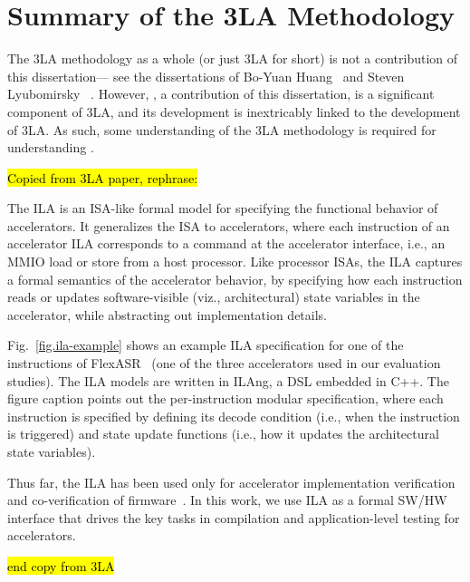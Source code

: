 \section{Summary of the 3LA Methodology}

The 3LA methodology as a whole
  (or just 3LA for short)
  is not a contribution of this dissertation---%
  see the dissertations of
  Bo-Yuan Huang~\cite{huang2022instruction}
  and 
  Steven Lyubomirsky%
  ~\cite{lyubomirsky2022compiler}.
However,
  \g, a contribution of this dissertation,
  is a 
  significant component of 3LA,
  and its development 
  is inextricably linked to the development
  of 3LA.
As such,
  some understanding of the 3LA
  methodology
  is required for understanding
  \g.
  


\hl{
Copied from 3LA paper, rephrase: 
}

The ILA is an ISA-like formal model 
  for specifying the functional behavior of accelerators.
It generalizes the ISA to accelerators, 
  where each 
  instruction of an accelerator ILA corresponds 
  to a command at the accelerator interface, i.e., an MMIO load or store from a host processor.
Like processor ISAs, 
  the ILA captures a formal semantics of the accelerator behavior, by specifying how each instruction 
  reads or updates software-visible (viz., architectural) state variables in the accelerator,
  while abstracting out implementation details. 
  
Fig.~\ref{fig.ila-example} shows an example
  ILA specification for one of the instructions of FlexASR~\cite{tambe20219} (one of the three accelerators used in our evaluation studies). The ILA models are written in ILAng, a DSL embedded in C++. The figure caption points out the per-instruction modular specification, where each instruction is specified by defining its decode condition (i.e., when the instruction is triggered) and state update functions (i.e., how it updates
  the architectural state variables). 

Thus far, the ILA has been used only for accelerator implementation verification and co-verification of firmware~\cite{huang2018formal,huang2018instruction}.
In this work, we use ILA as a formal SW/HW interface that drives the key tasks in compilation and application-level testing for accelerators.

\hl{end copy from 3LA }